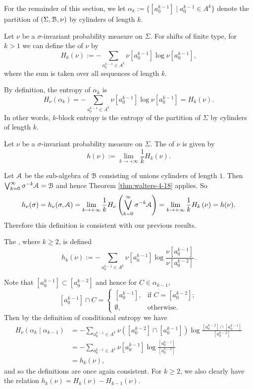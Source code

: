 For the remainder of this section, we let $\alpha_k := \{[a_0^{k - 1}] \mid a_0^{k - 1} \in A^k\}$ denote the partition of $(\Sigma, \mathcal{B}, \nu)$ by cylinders of length $k$.

\begin{definition}
	Let $\nu$ be a $\sigma$-invariant probability measure on $\Sigma$. For shifts of finite type, for $k > 1$ we can define the  of $\nu$ by
	\[
		H_k(\nu) := -\sum_{a_0^{k - 1} \in A^k}{\nu[a_0^{k - 1}] \log\nu[a_0^{k - 1}]},
	\]
	where the sum is taken over all sequences of length $k$.
\end{definition}

By definition, the entropy of $\alpha_k$ is
\[
	H_\nu(\alpha_k) = -\sum_{a_0^{k - 1} \in A^k}{\nu[a_0^{k - 1}] \log\nu[a_0^{k - 1}]} = H_k(\nu).
\]
In other words, $k$-block entropy is the entropy of the partition of $\Sigma$ by cylinders of length $k$.

\begin{definition}
	Let $\nu$ be a $\sigma$-invariant probability measure on $\Sigma$. The  of $\nu$ is given by
	\[
		h(\nu) := \lim_{k \to +\infty}{\frac{1}{k} H_k(\nu)}.
	\]
\end{definition}

Let $\mathcal{A}$ be the sub-algebra of $\mathcal{B}$ consisting of unions cylinders of length $1$. Then $\bigvee_{k = 0}^\infty{\sigma^{-k}{\mathcal{A}}} = \mathcal{B}$ and hence Theorem \ref{thm:walters-4-18} applies. So
\[
	h_\nu(\sigma) = h_\nu(\sigma, \mathcal{A}) = \lim_{k \to +\infty}{\frac{1}{k} H_\nu\left(\bigvee_{k = 0}^\infty{\sigma^{-k}{\mathcal{A}}}\right)} = \lim_{k \to +\infty}{\frac{1}{k} H_k\left(\nu\right)} = h(\nu).
\]
Therefore this definition is consistent with our previous results.

\begin{definition}
	The , where $k \geq 2$, is defined
	\[
		h_k(\nu) := -\sum_{a_0^{k - 1} \in A^k}{\nu[a_0^{k - 1}] \log{\frac{\nu[a_0^{k - 1}]}{\nu[a_0^{k - 2}]}}}.
	\]
\end{definition}

Note that $[a_0^{k - 1}] \subset [a_0^{k - 2}]$ and hence for $C \in \alpha_{k - 1}$,
\[
	[a_0^{k - 1}] \cap C =
	\begin{cases}
		\left[a_0^{k - 1}\right],	& \text{if } C = [a_0^{k - 2}]; \\
		\emptyset,	& \text{otherwise}.
	\end{cases}
\]
Then by the definition of conditional entropy we have
\begin{align*}
	H_\nu(\alpha_k \mid \alpha_{k - 1}) &= -\sum_{a_0^{k - 1} \in A^k}{\nu([a_0^{k - 2}] \cap [a_0^{k - 1}]) \log{\frac{[a_0^{k - 2}] \cap [a_0^{k - 1}]}{[a_0^{k - 2}]}}} \\
		&= -\sum_{a_0^{k - 1} \in A^k}{\nu[a_0^{k - 1}] \log{\frac{[a_0^{k - 1}]}{[a_0^{k - 2}]}}} \\
		&= h_k(\nu),
\end{align*}
and so the definitions are once again consistent. For $k \geq 2$, we also clearly have the relation $h_k(\nu) = H_k(\nu) - H_{k - 1}(\nu)$.

